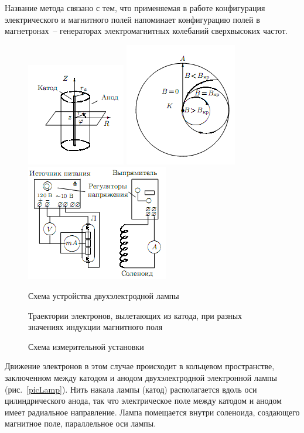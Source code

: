 \documentclass[pscyr]{hedwork}
\begin{document}
  Название метода связано с тем, что применяемая в работе конфигурация
  электрического и магнитного полей напоминает конфигурацию полей в
  магнетронах~-- генераторах электромагнитных колебаний сверхвысоких частот.

  \begin{figure}[ht]
    \center
    \includegraphics{sl_8_1} \hspace{1em}
    \includegraphics{sl_8_2} \hspace{1em}
    \includegraphics{sl_8_3} \\
    \parbox{10em}{\caption{Схема устройства двухэлектродной лампы}
      \label{picLamp}} \hspace{1ex}
    \parbox{10em}{\caption{Траектории электронов, вылетающих из катода, при
      разных значениях индукции магнитного поля} \label{picElsFly}} \hspace{1ex}
    \parbox{13em}{\caption{Схема измерительной установки} \label{picSchem}}
  \end{figure}

  Движение электронов в этом случае происходит в кольцевом пространстве,
  заключенном между катодом и анодом двухэлектродной электронной лампы
  (рис.~\ref{picLamp}). Нить накала лампы (катод) располагается вдоль оси
  цилиндрического анода, так что электрическое поле между катодом и анодом имеет
  радиальное направление. Лампа помещается внутри соленоида, создающего
  магнитное поле, параллельное оси лампы.
\end{document}
